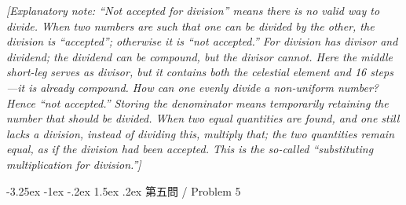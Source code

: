 \documentclass[11pt,a4paper]{article}
\makeatletter
\newlength{\chwidth}
\newcommand{\zh}[1]{{\CJKfamily{sf}#1}}
\newenvironment{bilingual}{%
  \noindent
  \begin{minipage}[t]{\chwidth}%
  \small
}{%
  \end{minipage}%
}
\renewcommand{\subsubsection}{\@startsection{subsubsection}{3}{\z@}%
  {-3.25ex \@plus -1ex \@minus -.2ex}%
  {1.5ex \@plus .2ex}%
  {\normalfont\normalsize\bfseries\color{sectioncolor}}}
\makeatother
\begin{document}
\begin{bilingual}
\vspace{0.2cm}
\noindent\textit{[Explanatory note: ``Not accepted for division'' means there is no valid way to divide. When two numbers are such that one can be divided by the other, the division is ``accepted''; otherwise it is ``not accepted.'' For division has divisor and dividend; the dividend can be compound, but the divisor cannot. Here the middle short-leg serves as divisor, but it contains both the celestial element and 16 steps---it is already compound. How can one evenly divide a non-uniform number? Hence ``not accepted.'' Storing the denominator means temporarily retaining the number that should be divided. When two equal quantities are found, and one still lacks a division, instead of dividing this, multiply that; the two quantities remain equal, as if the division had been accepted. This is the so-called ``substituting multiplication for division.'']}
\end{bilingual}

\vspace{0.5cm}

\subsubsection{\zh{第五問} / Problem 5}
\end{document}
